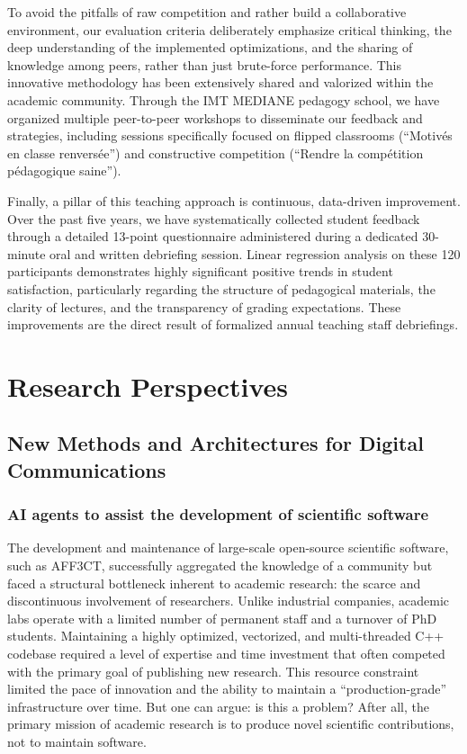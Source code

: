 \documentclass[11pt]{report}
\begin{document}
To avoid the pitfalls of raw competition and rather build a collaborative environment, our evaluation criteria deliberately emphasize critical thinking, the deep understanding of the implemented optimizations, and the sharing of knowledge among peers, rather than just brute-force performance. This innovative methodology has been extensively shared and valorized within the academic community. Through the IMT MEDIANE pedagogy school, we have organized multiple peer-to-peer workshops to disseminate our feedback and strategies, including sessions specifically focused on flipped classrooms (``Motivés en classe renversée'') and constructive competition (``Rendre la compétition pédagogique saine'').

Finally, a pillar of this teaching approach is continuous, data-driven improvement. Over the past five years, we have systematically collected student feedback through a detailed 13-point questionnaire administered during a dedicated 30-minute oral and written debriefing session. Linear regression analysis on these 120 participants demonstrates highly significant positive trends in student satisfaction, particularly regarding the structure of pedagogical materials, the clarity of lectures, and the transparency of grading expectations. These improvements are the direct result of formalized annual teaching staff debriefings.


\chapter{Research Perspectives}
\label{sec:transmission_perspectives}

\section{New Methods and Architectures for Digital Communications}
\subsection{AI agents to assist the development of scientific software}

The development and maintenance of large-scale open-source scientific software, such as AFF3CT, successfully aggregated the knowledge of a community but faced a structural bottleneck inherent to academic research: the scarce and discontinuous involvement of researchers. Unlike industrial companies, academic labs operate with a limited number of permanent staff and a turnover of PhD students. Maintaining a highly optimized, vectorized, and multi-threaded C++ codebase required a level of expertise and time investment that often competed with the primary goal of publishing new research. This resource constraint limited the pace of innovation and the ability to maintain a ``production-grade'' infrastructure over time. But one can argue: is this a problem? After all, the primary mission of academic research is to produce novel scientific contributions, not to maintain software.
\end{document}
